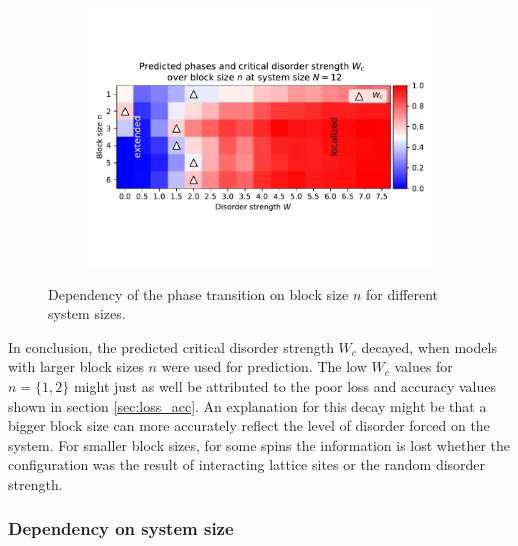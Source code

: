 \documentclass[reprint,amsmath,amssymb,aps,prb]{revtex4-2}
\begin{document}
\begin{center}
\begin{figure}[H]
\begin{subfigure}[c]{0.45\textwidth}
			\includegraphics[width=\textwidth]{../results/Wc/N12_Wc_n_dependency.pdf}
		\end{subfigure}
		\caption{Dependency of the phase transition on block size $n$ for different system sizes.}
		\label{fig:wcextractn}
	\end{figure}
\end{center}
\twocolumngrid

In conclusion, the predicted critical disorder strength $W_c$ decayed, when models with larger block sizes $n$ were used for prediction. The low $W_c$ values for $n=\{1,2\}$ might just as well be attributed to the poor loss and accuracy values shown in section \ref{sec:loss_acc}. An explanation for this decay might be that a bigger block size can more accurately reflect the level of disorder forced on the system. For smaller block sizes, for some spins the information is lost whether the configuration was the result of interacting lattice sites or the random disorder strength.

\subsubsection{Dependency on system size}


\end{document}
